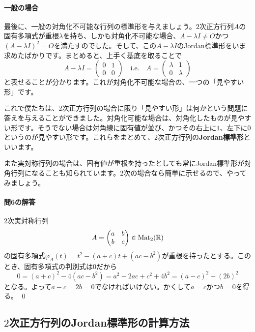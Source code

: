 \paragraph{一般の場合}

最後に、一般の対角化不可能な行列の標準形を与えましょう。$2$次正方行列$A$の固有多項式が重根$\lambda$を持ち、しかも対角化不可能な場合、$A - \lambda I \neq O$かつ$(A - \lambda I)^2 = O$を満たすのでした。そして、この$A - \lambda I$のJordan標準形をいま求めたばかりです。まとめると、上手く基底を取ることで
\[
A - \lambda I = 
\begin{pmatrix}
0 & 1 \\
0 & 0
\end{pmatrix}
\quad \text{i.e.} \quad
A =
\begin{pmatrix}
\lambda & 1 \\
0 & \lambda
\end{pmatrix}
\]
と表せることが分かります。これが対角化不可能な場合の、一つの「見やすい形」です。

これで僕たちは、$2$次正方行列の場合に限り「見やすい形」は何かという問題に答えを与えることができました。対角化可能な場合は、対角化したものが見やすい形です。そうでない場合は対角線に固有値が並び、かつその右上に$1$、左下に$0$というのが見やすい形です。これらをまとめて、$2$次正方行列の\textbf{Jordan標準形}といいます。

また実対称行列の場合は、固有値が重根を持ったとしても常にJordan標準形が対角行列になることも知られています。$2$次の場合なら簡単に示せるので、やってみましょう。

\paragraph{問6の解答}

$2$次実対称行列
\[
A = 
\begin{pmatrix}
a & b \\
b & c
\end{pmatrix} \in \operatorname{Mat}_2(\mathbb{R})
\]
の固有多項式$\varphi_A(t) = t^2 - (a + c)t + (ac - b^2)$が重根を持ったとする。このとき、固有多項式の判別式は$0$だから
\[
0 = (a + c)^2 - 4(ac - b^2) = a^2 - 2ac + c^2 + 4b^2 = (a - c)^2 + (2b)^2
\]
となる。よって$a - c = 2b = 0$でなければいけない。かくして$a = c$かつ$b = 0$を得る。 \qed

\subsection{$2$次正方行列のJordan標準形の計算方法}

